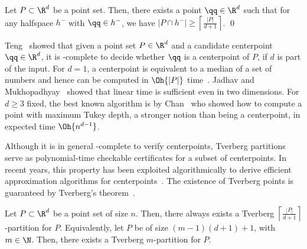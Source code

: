 \begin{theorem}\label{thm:centerpoint}
Let $P \subset \R^d$ be a point set. Then, there exists a point $\qq \in
\R^d$ such that for any halfspace $h^-$ with $\qq \in h^-$, we 
have $|P \cap h^-| \geq \left\lceil\frac{|P|}{d+1}\right\rceil$. \qed
\end{theorem}

Teng~\cite[Theorem~8.4]{Teng1991} showed that given a point set 
$P \in \R^d$ and a candidate centerpoint $\qq \in \R^d$, it is 
\coNP-complete to decide whether $\qq$ is
a centerpoint of $P$, if $d$ is part of the input. 
For $d=1$, a centerpoint is equivalent to a median of a set of 
numbers and hence can be computed in $\Oh{|P|}$ 
time~\cite{BlumFlPrRiTa1973}. Jadhav and Mukhopadhyay~\cite{JadhavMu1994} 
showed that linear time is sufficient even in two dimensions. For 
$d\geq 3$ fixed, the best known algorithm is by Chan~\cite{Chan2004} 
who showed how to compute a point with maximum Tukey depth,
a stronger notion than being a centerpoint, in expected time 
$\Oh{n^{d-1}}$.

Although it is in general \coNP-complete to verify centerpoints, Tverberg
partitions serve as
polynomial-time checkable certificates for a subset of centerpoints.
In recent years, this property has been exploited algorithmically to derive
efficient approximation algorithms for
centerpoints~\cite{MulzerWe2013,MillerSh2010}.
The existence of Tverberg points is guaranteed by Tverberg's
theorem~\cite{Tverberg1966}.

\begin{theorem}\label{thm:tverberg}
  Let $P \subset \R^d$ be a point set of size $n$. Then, there 
  always exists a
  Tverberg $\left\lceil\frac{|P|}{d+1}\right\rceil$-partition for $P$.
  Equivalently, let $P$ be of size $(m-1)(d+1)+1$, with $m \in \N$. 
  Then, there exists a Tverberg $m$-partition for $P$.
\end{theorem}

